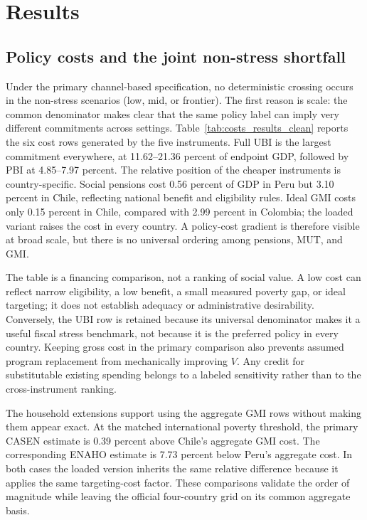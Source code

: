 \section{Results}\label{sec:results}

\subsection{Policy costs and the joint non-stress shortfall}\label{subsec:results_costs_shortfall}

Under the primary channel-based specification, no deterministic crossing occurs in the non-stress scenarios (low, mid, or frontier). The first reason is scale: the common denominator makes clear that the same policy label can imply very different commitments across settings. Table~\ref{tab:costs_results_clean} reports the six cost rows generated by the five instruments. Full UBI is the largest commitment everywhere, at 11.62--21.36 percent of endpoint GDP, followed by PBI at 4.85--7.97 percent. The relative position of the cheaper instruments is country-specific. Social pensions cost 0.56 percent of GDP in Peru but 3.10 percent in Chile, reflecting national benefit and eligibility rules. Ideal GMI costs only 0.15 percent in Chile, compared with 2.99 percent in Colombia; the loaded variant raises the cost in every country. A policy-cost gradient is therefore visible at broad scale, but there is no universal ordering among pensions, MUT, and GMI.



The table is a financing comparison, not a ranking of social value. A low cost can reflect narrow eligibility, a low benefit, a small measured poverty gap, or ideal targeting; it does not establish adequacy or administrative desirability. Conversely, the UBI row is retained because its universal denominator makes it a useful fiscal stress benchmark, not because it is the preferred policy in every country. Keeping gross cost in the primary comparison also prevents assumed program replacement from mechanically improving $V$. Any credit for substitutable existing spending belongs to a labeled sensitivity rather than to the cross-instrument ranking.

The household extensions support using the aggregate GMI rows without making them appear exact. At the matched international poverty threshold, the primary CASEN estimate is 0.39 percent above Chile's aggregate GMI cost. The corresponding ENAHO estimate is 7.73 percent below Peru's aggregate cost. In both cases the loaded version inherits the same relative difference because it applies the same targeting-cost factor. These comparisons validate the order of magnitude while leaving the official four-country grid on its common aggregate basis.

